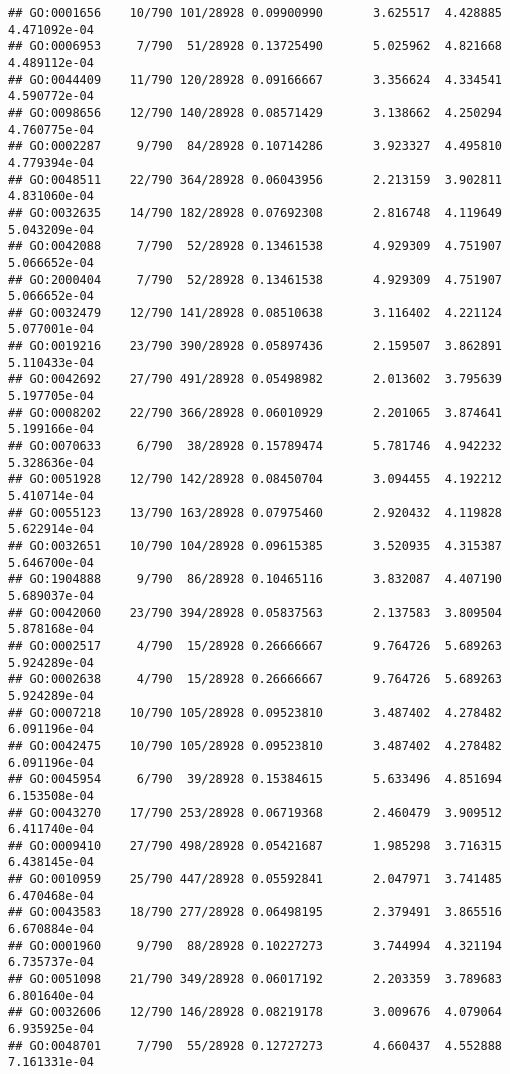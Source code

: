 \documentclass[
]{article}
\begin{document}
\begin{verbatim}
## GO:0001656    10/790 101/28928 0.09900990       3.625517  4.428885 4.471092e-04
## GO:0006953     7/790  51/28928 0.13725490       5.025962  4.821668 4.489112e-04
## GO:0044409    11/790 120/28928 0.09166667       3.356624  4.334541 4.590772e-04
## GO:0098656    12/790 140/28928 0.08571429       3.138662  4.250294 4.760775e-04
## GO:0002287     9/790  84/28928 0.10714286       3.923327  4.495810 4.779394e-04
## GO:0048511    22/790 364/28928 0.06043956       2.213159  3.902811 4.831060e-04
## GO:0032635    14/790 182/28928 0.07692308       2.816748  4.119649 5.043209e-04
## GO:0042088     7/790  52/28928 0.13461538       4.929309  4.751907 5.066652e-04
## GO:2000404     7/790  52/28928 0.13461538       4.929309  4.751907 5.066652e-04
## GO:0032479    12/790 141/28928 0.08510638       3.116402  4.221124 5.077001e-04
## GO:0019216    23/790 390/28928 0.05897436       2.159507  3.862891 5.110433e-04
## GO:0042692    27/790 491/28928 0.05498982       2.013602  3.795639 5.197705e-04
## GO:0008202    22/790 366/28928 0.06010929       2.201065  3.874641 5.199166e-04
## GO:0070633     6/790  38/28928 0.15789474       5.781746  4.942232 5.328636e-04
## GO:0051928    12/790 142/28928 0.08450704       3.094455  4.192212 5.410714e-04
## GO:0055123    13/790 163/28928 0.07975460       2.920432  4.119828 5.622914e-04
## GO:0032651    10/790 104/28928 0.09615385       3.520935  4.315387 5.646700e-04
## GO:1904888     9/790  86/28928 0.10465116       3.832087  4.407190 5.689037e-04
## GO:0042060    23/790 394/28928 0.05837563       2.137583  3.809504 5.878168e-04
## GO:0002517     4/790  15/28928 0.26666667       9.764726  5.689263 5.924289e-04
## GO:0002638     4/790  15/28928 0.26666667       9.764726  5.689263 5.924289e-04
## GO:0007218    10/790 105/28928 0.09523810       3.487402  4.278482 6.091196e-04
## GO:0042475    10/790 105/28928 0.09523810       3.487402  4.278482 6.091196e-04
## GO:0045954     6/790  39/28928 0.15384615       5.633496  4.851694 6.153508e-04
## GO:0043270    17/790 253/28928 0.06719368       2.460479  3.909512 6.411740e-04
## GO:0009410    27/790 498/28928 0.05421687       1.985298  3.716315 6.438145e-04
## GO:0010959    25/790 447/28928 0.05592841       2.047971  3.741485 6.470468e-04
## GO:0043583    18/790 277/28928 0.06498195       2.379491  3.865516 6.670884e-04
## GO:0001960     9/790  88/28928 0.10227273       3.744994  4.321194 6.735737e-04
## GO:0051098    21/790 349/28928 0.06017192       2.203359  3.789683 6.801640e-04
## GO:0032606    12/790 146/28928 0.08219178       3.009676  4.079064 6.935925e-04
## GO:0048701     7/790  55/28928 0.12727273       4.660437  4.552888 7.161331e-04

\end{verbatim}
\end{document}
